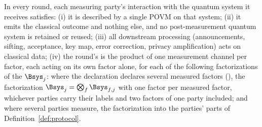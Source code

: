 \begin{assumption}\label{ass:meas}
In every round, each measuring party's interaction with the quantum system it
receives satisfies:
(i) it is described by a single POVM on that system;
(ii) it emits the classical outcome and nothing else, and no
post-measurement quantum system is retained or reused;
(iii) all downstream processing (announcements, sifting, acceptance, key map,
error correction, privacy amplification) acts on classical data;
(iv) the round's  is the product of one
measurement channel per factor, each acting on its own factor alone, for each
of the following factorizations of the  $\Bsys_j$:
where the declaration declares several measured factors
(), the factorization
$\Bsys_j=\bigotimes_f\Bsys_{f,j}$ with one factor per measured factor,
whichever parties carry their labels and two factors of one party included;
and where several parties measure, the factorization into the parties'
parts of Definition~\ref{def:protocol}.
\end{assumption}

